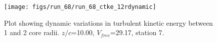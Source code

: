\begin{figure}[H]
\centering
\texttt{[image: figs/run\_68/run\_68\_ctke\_12rdynamic]}
\caption{Plot showing dynamic variations in turbulent kinetic energy between 1 and 2 core radii. $z/c$=10.00, $V_{free}$=29.17, station 7.}
\end{figure}


